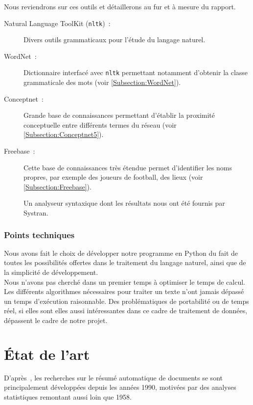 \documentclass[a4paper, 12pt]{article}
\newcommand{\pyt}[1]{\texttt{#1}}%
\begin{document}
Nous reviendrons sur ces outils et détaillerons au fur et à mesure du rapport.

\begin{description}
	\item[Natural Language ToolKit (\pyt{nltk})~: ]Divers outils grammaticaux pour l'étude du langage naturel.
	\item[WordNet~: ]Dictionnaire interfacé avec \pyt{nltk} permettant notamment d'obtenir la classe grammaticale des mots (voir \ref{Subsection:WordNet}).
	\item[Conceptnet~: ]Grande base de connaissances permettant d'établir la proximité conceptuelle entre différents termes du réseau (voir \ref{Subsection:Conceptnet5}).
	\item[Freebase~: ]Cette base de connaissances très étendue permet d'identifier les noms propres, par exemple des joueurs de football, des lieux (voir \ref{Subsection:Freebase}).

	\item[] Un analyseur syntaxique dont les résultats nous ont été fournis par Systran.
\end{description}

\subsubsection{Points techniques}

Nous avons fait le choix de développer notre programme en Python du fait de toutes les possibilités offertes dans le traitement du langage naturel, ainsi que de la simplicité de développement.\\

Nous n'avons pas cherché dans un premier temps à optimiser le temps de calcul. Les différents algorithmes nécessaires pour traiter un texte n'ont jamais dépassé un temps d'exécution raisonnable. Des problématiques de portabilité ou de temps réel, si elles sont elles aussi intéressantes dans ce cadre de traitement de données, dépassent le cadre de notre projet.


\section{État de l'art} %



D'après~\cite{jones_automatic_2007}, les recherches sur le résumé automatique de documents se sont principalement développées depuis les années 1990, motivées par des analyses statistiques remontant aussi loin que 1958.\\
\end{document}
